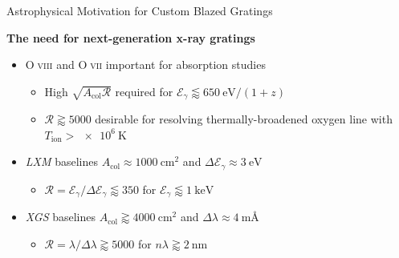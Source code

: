 \documentclass[aspectratio=169,9pt]{beamer}
\newcommand\ion[2]{#1$\;${\scshape{#2}}}%
\begin{document}
\begin{frame}{Astrophysical Motivation for Custom Blazed Gratings}
 \begin{minipage}[t]{0.55\linewidth}
 \textbf{The need for next-generation x-ray gratings}
 \begin{itemize}
  \item \ion{O}{viii} and \ion{O}{vii} important for absorption studies
  \begin{itemize}
    \item High $\sqrt{A_{\text{col}} \mathscr{R}}$ required for $\mathcal{E}_{\gamma} \lessapprox \SI{650}{\electronvolt} / (1 + z)$
    \item $\mathscr{R} \gtrapprox 5000$ desirable for resolving thermally-broadened oxygen line with $T_{\text{ion}} > \SI{e6}{\kelvin}$ 
  \end{itemize}
 \end{itemize}
 \begin{itemize}
  \item \emph{LXM} baselines $A_{\text{col}} \approx \SI{1000}{\cm\squared}$ and $\Delta \mathcal{E}_{\gamma} \approx \SI{3}{\electronvolt}$ 
  \begin{itemize}
    \item $\mathscr{R} = \mathcal{E}_{\gamma} / \Delta \mathcal{E}_{\gamma} \lessapprox 350$ for $\mathcal{E}_{\gamma} \lessapprox \SI{1}{\kilo\electronvolt}$
  \end{itemize} 
  \item \emph{XGS} baselines $A_{\text{col}} \gtrapprox \SI{4000}{\cm\squared}$ and $\Delta \lambda \approx \SI{4}{\milli\angstrom}$
  \begin{itemize}
    \item $\mathscr{R} = \lambda / \Delta \lambda \gtrapprox 5000$ for $n \lambda \gtrapprox \SI{2}{\nm}$ %

\end{itemize}
\end{itemize}
\end{minipage}
\end{frame}
\end{document}

